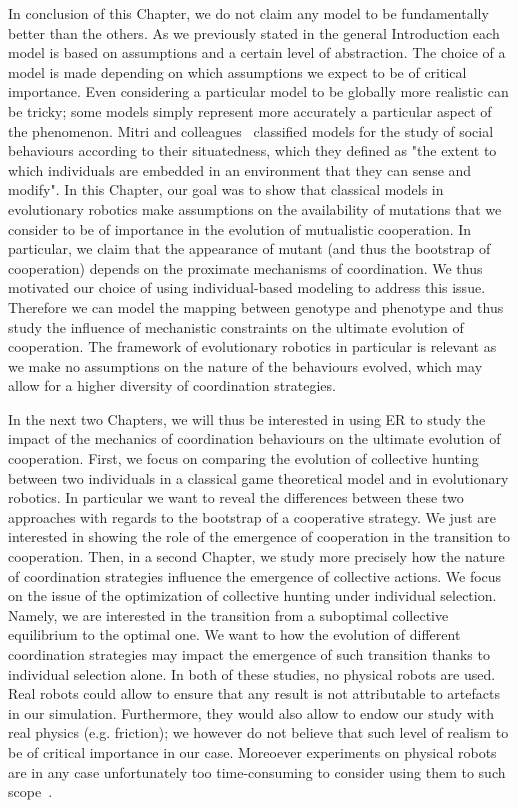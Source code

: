     In conclusion of this Chapter, we do not claim any model to be fundamentally better than the others. As we previously stated in the general Introduction each model is based on assumptions and a certain level of abstraction. The choice of a model is made depending on which assumptions we expect to be of critical importance. Even considering a particular model to be globally more realistic can be tricky; some models simply represent more accurately a particular aspect of the phenomenon. Mitri and colleagues~\parencite{Mitri2012} classified models for the study of social behaviours according to their situatedness, which they defined as "the extent to which individuals are embedded in an environment that they can sense and modify". In this Chapter, our goal was to show that classical models in evolutionary robotics make assumptions on the availability of mutations that we consider to be of importance in the evolution of mutualistic cooperation. In particular, we claim that the appearance of mutant (and thus the bootstrap of cooperation) depends on the proximate mechanisms of coordination. We thus motivated our choice of using individual-based modeling to address this issue. Therefore we can model the mapping between genotype and phenotype and thus study the influence of mechanistic constraints on the ultimate evolution of cooperation. The framework of evolutionary robotics in particular is relevant as we make no assumptions on the nature of the behaviours evolved, which may allow for a higher diversity of coordination strategies.

    In the next two Chapters, we will thus be interested in using ER to study the impact of the mechanics of coordination behaviours on the ultimate evolution of cooperation. First, we focus on comparing the evolution of collective hunting between two individuals in a classical game theoretical model and in evolutionary robotics. In particular we want to reveal the differences between these two approaches with regards to the bootstrap of a cooperative strategy. We just are interested in showing the role of the emergence of cooperation in the transition to cooperation. Then, in a second Chapter, we study more precisely how the nature of coordination strategies influence the emergence of collective actions. We focus on the issue of the optimization of collective hunting under individual selection. Namely, we are interested in the transition from a suboptimal collective equilibrium to the optimal one. We want to how the evolution of different coordination strategies may impact the emergence of such transition thanks to individual selection alone. In both of these studies, no physical robots are used. Real robots could allow to ensure that any result is not attributable to artefacts in our simulation. Furthermore, they would also allow to endow our study with real physics (e.g. friction); we however do not believe that such level of realism to be of critical importance in our case. Moreoever experiments on physical robots are in any case unfortunately too time-consuming to consider using them to such scope~\parencite{Mitri2012, Doncieux2015a}.

